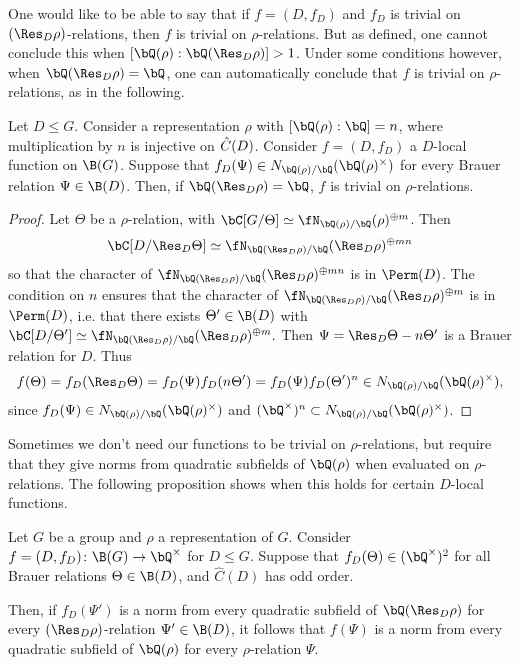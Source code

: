  One would like to be able to say that if $f = (D, f_D)$ and $f_D$ is trivial on $(\Res_D \rho)$-relations, then $f$ is trivial on $\rho$-relations. But as defined, one cannot conclude this when $[\bQ(\rho) : \bQ(\Res_D \rho) ] > 1$. Under some conditions however, when $\bQ(\Res_D \rho) = \bQ$, one can automatically conclude that $f$ is trivial on $\rho$-relations, as in the following.

\begin{prop}\label{rational-res}
Let $D \leq G$. Consider a representation $\rho$ with $[\bQ(\rho) : \bQ] = n$, where multiplication by $n$ is injective on $\hat{C}(D)$. Consider $f = (D, f_D)$ a $D$-local function on $\B(G)$. 
Suppose that $f_D(\Psi) \in \fieldnorm{\rho}$ for every Brauer relation $\Psi \in \B(D)$.
Then, if $\bQ(\Res_D \rho) = \bQ$, $f$ is trivial on $\rho$-relations.
\end{prop}

\begin{proof}
    Let $\Theta$ be a $\rho$-relation, with $\bC[G / \Theta] \simeq \repnorm{\rho}^{\oplus m}$. Then $$\bC[D / \Res_D \Theta] \simeq \repnorm{\Res_D \rho}^{\oplus m n}$$
    so that the character of $\repnorm{\Res_D \rho}^{\oplus m n}$ is in $\Perm(D)$.
    The condition on $n$ ensures that the character of $\repnorm{\Res_D \rho}^{\oplus m}$ is in $\Perm(D)$, i.e. that there exists $\Theta' \in \B(D)$ with $\bC[D / \Theta'] \simeq \repnorm{\Res_D \rho}^{\oplus m}.$ Then $\Psi = \Res_D\Theta - n\Theta'$ is a Brauer relation for $D$. Thus
    \[ f(\Theta) = f_D(\Res_D \Theta) = f_D(\Psi)f_D(n\Theta') = f_D(\Psi)f_D(\Theta')^n \in \fieldnorm{\rho}, \]
    since $f_D(\Psi) \in \fieldnorm{\rho}$ and $(\bQ^{\times})^n \subset \fieldnorm{\rho}$. 
\end{proof}

Sometimes we don't need our functions to be trivial on $\rho$-relations, but require that they give norms from quadratic subfields of $\bQ(\rho)$ when evaluated on $\rho$-relations. The following proposition shows when this holds for certain $D$-local functions.

\begin{prop}\label{prop-restrict-decomp}
Let $G$ be a group and $\rho$ a representation of $G$. Consider $f = (D, f_D) \colon \B(G) \to \bQ^{\times}$ for $D \leq G$. Suppose that $f_D(\Theta) \in (\bQ^{\times})^2$ for all Brauer relations $\Theta \in \B(D)$, and $\hat{C}(D)$ has odd order.

Then, if $f_D(\Psi')$ is a norm from every quadratic subfield of $\bQ(\Res_D \rho)$ for every $(\Res_D \rho)$-relation $\Psi' \in \B(D)$, it follows that $f(\Psi)$ is a norm from every quadratic subfield of $\bQ(\rho)$ for every $\rho$-relation $\Psi$. 
\end{prop}

